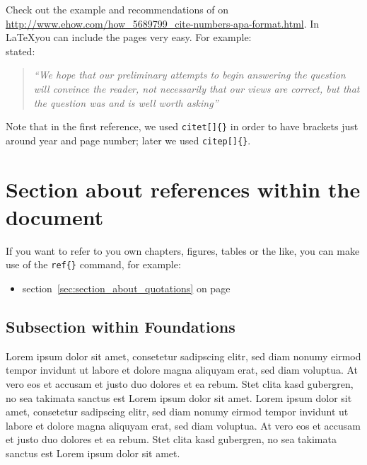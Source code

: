 \documentclass[a4paper]{article}
\begin{document}
Check out the example and recommendations of \cite{Hall} on \url{http://www.ehow.com/how_5689799_cite-numbers-apa-format.html}. In \LaTeX you can include the pages very easy. For example: \\

\citet[p. 86]{Baddeley:1974ts} stated: 

\begin{quotation}
	\emph{``We hope that our preliminary attempts to begin answering the question will convince the reader, not necessarily that our views are correct, but that the question was and is well worth asking''}
	\citep[p. 86]{Baddeley:1974ts}
\end{quotation}

Note that in the first reference, we used \texttt{citet[]\{\}} in order to have brackets just around year and page number; later we used \texttt{citep[]\{\}}.



\section{Section about references within the document} %
\label{sec:section_about_references_within_the_document}

If you want to refer to you own chapters, figures, tables or the like, you can make use of the \texttt{ref\{\}} command, for example:
\begin{itemize}
	\item section~\ref{sec:section_about_quotations} on page \pageref{sec:section_about_quotations}
\end{itemize} 




\subsection{Subsection within Foundations} %
\label{sub:subsection_within_foundations}
Lorem ipsum dolor sit amet, consetetur sadipscing elitr, sed diam nonumy eirmod tempor invidunt ut labore et dolore magna aliquyam erat, sed diam voluptua. At vero eos et accusam et justo duo dolores et ea rebum. Stet clita kasd gubergren, no sea takimata sanctus est Lorem ipsum dolor sit amet. Lorem ipsum dolor sit amet, consetetur sadipscing elitr, sed diam nonumy eirmod tempor invidunt ut labore et dolore magna aliquyam erat, sed diam voluptua. At vero eos et accusam et justo duo dolores et ea rebum. Stet clita kasd gubergren, no sea takimata sanctus est Lorem ipsum dolor sit amet.
\end{document}

